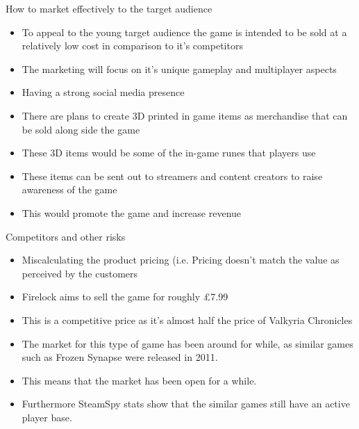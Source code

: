 \documentclass{beamer}
\begin{document}
\begin{frame}{How to market effectively to the target audience}
	 \pause
	\begin{itemize}
		\item To appeal to the young target audience the game is intended to be sold at a relatively low cost in comparison to it's competitors \pause
		\item The marketing will focus on it's unique gameplay and multiplayer aspects \pause
		\item Having a strong social media presence \pause
	\end{itemize}	
	
	 \pause
	\begin{itemize}
		\item There are plans to create 3D printed in game items as merchandise that can be sold along side the game \pause
		\item These 3D items would be some of the in-game runes that players use \pause
		\item These items can be sent out to streamers and content creators to raise awareness of the game \pause
		\item This would promote the game and increase revenue \pause
	\end{itemize}
	
	
\end{frame}

\begin{frame}{Competitors and other risks}
	 \pause
	\begin{itemize}
		\item Miscalculating the product pricing (i.e. Pricing doesn't match the value as perceived by the customers \pause
		\item Firelock aims to sell the game for roughly \pounds 7.99 \pause
		\item This is a competitive price as it's almost half the price of Valkyria Chronicles \pause

	\end{itemize}
	 \pause
	\begin {itemize}
		\item The market for this type of game has been around for while, as similar games such as Frozen Synapse were released in 2011. \pause
		\item This means that the market has been open for a while. \pause
		\item Furthermore SteamSpy stats show that the similar games still have an active player base. \pause %
	\end{itemize}
	

\end{frame}
\end{document}
